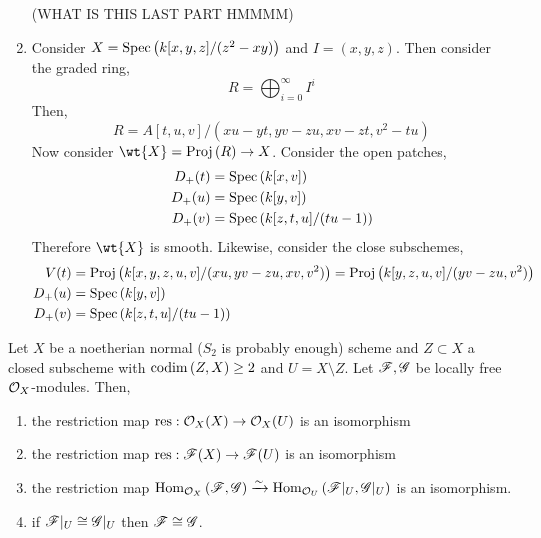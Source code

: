 \documentclass[12pt]{article}
\begin{document}
\begin{enumerate}
(WHAT IS THIS LAST PART HMMMM)
\item Consider $X = \mathrm{Spec}\left( k[x,y,z]/(z^2 - xy) \right)$ and $I = (x,y,z)$. Then consider the graded ring,
\[ R = \bigoplus_{i = 0}^\infty I^i \]
Then,
\[ R = A[t, u, v]/(x u - y t, y v - z u, x v - z t, v^2 - tu) \]
Now consider $\wt{X} = \Proj{R} \to X$. Consider the open patches,
\begin{align*}
D_+(t) & = \mathrm{Spec}\left( k[x, v] \right) 
\\
D_+(u) & = \mathrm{Spec}\left( k[y, v] \right) 
\\
D_+(v) & = \mathrm{Spec}\left( k[z, t, u]/(tu - 1) \right)
\end{align*}
Therefore $\wt{X}$ is smooth. Likewise, consider the close subschemes,
\begin{align*}
V(t) & = \mathrm{Proj}\left( k[x, y, z, u, v]/(xu, yv - zu, xv, v^2) \right) = \mathrm{Proj}\left( k[y, z, u, v]/(yv - zu, v^2) \right)
\\
D_+(u) & = \mathrm{Spec}\left( k[y, v] \right) 
\\
D_+(v) & = \mathrm{Spec}\left( k[z, t, u]/(tu - 1) \right)
\end{align*}
\end{enumerate}


\begin{lemma}
Let $X$ be a noetherian normal ($S_2$ is probably enough) scheme and $Z \subset X$ a closed subscheme with $\mathrm{codim}\left( Z,X \right) \ge 2$ and $U = X \setminus Z$. Let $\mathscr{F}, \mathscr{G}$ be locally free $\mathcal{O}_{X}$-modules. Then,
\begin{enumerate}
\item the restriction map $\mathrm{res} : \mathcal{O}_{X}(X) \to \mathcal{O}_{X}(U)$ is an isomorphism
\item the restriction map $\mathrm{res} : \mathscr{F}(X) \to \mathscr{F}(U)$ is an isomorphism
\item the restriction map $\mathrm{Hom}_{\mathcal{O}_{X}} \left( \mathscr{F}, \mathscr{G} \right) \xrightarrow{\sim} \mathrm{Hom}_{\mathcal{O}_{U}} \left( \mathscr{F}|_U, \mathscr{G}|_U \right)$
is an isomorphism.
\item if $\mathscr{F}|_U \cong \mathscr{G}|_U$ then $\mathscr{F} \cong \mathscr{G}$. 
\end{enumerate}
\end{lemma}
\end{document}
